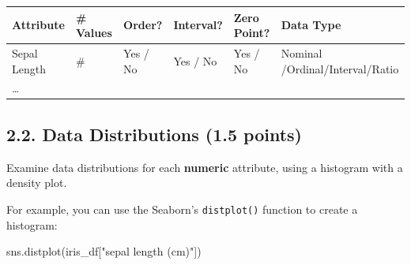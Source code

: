 \documentclass[
  letterpaper,
]{scrbook}
\newenvironment{Shaded}{\begin{snugshade}}{\end{snugshade}}
\newcommand{\NormalTok}[1]{\textcolor[rgb]{0.00,0.23,0.31}{#1}}
\newcommand{\StringTok}[1]{\textcolor[rgb]{0.13,0.47,0.30}{#1}}
\newcounter{none} %
\begin{document}
{\def\LTcaptype{none} %
\begin{longtable}[]{@{}
  >{\raggedright\arraybackslash}p{}
  >{\raggedright\arraybackslash}p{}
  >{\raggedright\arraybackslash}p{}
  >{\raggedright\arraybackslash}p{}
  >{\raggedright\arraybackslash}p{}
  >{\raggedright\arraybackslash}p{}@{}}
\toprule\noalign{}
\begin{minipage}[b]{\linewidth}\raggedright
Attribute
\end{minipage} & \begin{minipage}[b]{\linewidth}\raggedright
\# Values
\end{minipage} & \begin{minipage}[b]{\linewidth}\raggedright
Order?
\end{minipage} & \begin{minipage}[b]{\linewidth}\raggedright
Interval?
\end{minipage} & \begin{minipage}[b]{\linewidth}\raggedright
Zero Point?
\end{minipage} & \begin{minipage}[b]{\linewidth}\raggedright
Data Type
\end{minipage} \\
\midrule\noalign{}
\endhead
\bottomrule\noalign{}
\endlastfoot
Sepal Length & \# & Yes / No & Yes / No & Yes / No & Nominal
/Ordinal/Interval/Ratio \\
\ldots{} & & & & & \\
\end{longtable}
}

\subsection*{2.2. Data Distributions (1.5
points)}\label{data-distributions-1.5-points}

Examine data distributions for each \textbf{numeric} attribute, using a
histogram with a density plot.

For example, you can use the Seaborn's \texttt{distplot()} function to
create a histogram:

\begin{Shaded}
\begin{Highlighting}[]
\NormalTok{sns.distplot(iris\_df[}\StringTok{"sepal length (cm)"}\NormalTok{])}
\end{Highlighting}
\end{Shaded}
\end{document}
